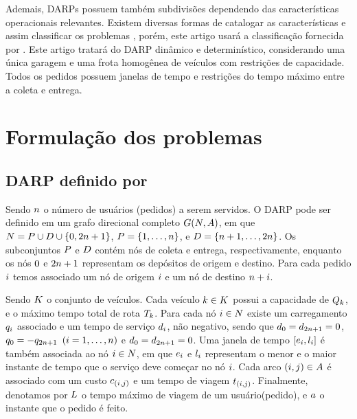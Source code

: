 \documentclass{anpet}
\begin{document}
Ademais, DARPs possuem também subdivisões dependendo das características operacionais relevantes. Existem diversas formas de catalogar as características e assim classificar os problemas \parencite{molenbruch_typology_2017, psaraftis_dynamic_2015, pillac_review_2013}, porém, este artigo usará a classificação fornecida por \textcite{ho_survey_2018}. Este artigo tratará do DARP dinâmico e determinístico, considerando uma única garagem e uma frota homogênea de veículos com restrições de capacidade. Todos os pedidos possuem janelas de tempo e restrições do tempo máximo entre a coleta e entrega.

\section{Formulação dos problemas}
\subsection{DARP definido por \textcite{cordeau_branch-and-cut_2006}}
Sendo $n$ o número de usuários (pedidos) a serem servidos. O DARP pode ser definido em um grafo direcional completo $G(N,A)$, em que $N = P \cup D \cup \{0, 2n{} + 1 \}$, $P = \{1, \ldots, n\}$, e $D = \{n + 1, \ldots, 2n\}$. Os subconjuntos $P$ e $D$ contém nós de coleta e entrega, respectivamente, enquanto os nós $0$ e $2n{} + 1$ representam os depósitos de origem e destino. Para cada pedido $i$ temos associado um nó de origem $i{}$ e um nó de destino ${n{} + i{}}$.

Sendo $K$ o conjunto de veículos. Cada veículo $k \in K$ possui a capacidade de $Q_{k}$, e o máximo tempo total de rota $T_k$. Para cada nó $i{} \in N$ existe um carregamento $q_i{}$ associado e um tempo de serviço $d_{i{}}$, não negativo, sendo que $d_{0} = d_{2n{} + 1} = 0$, $q_{0} = -q_{2n{} + 1}$ $(i = 1,\ldots,n)$ e $d_0 = d_{2n{} + 1} = 0$. Uma janela de tempo $[e_i{},l_i{}]$ é também associada ao nó $i{} \in N$, em que $e_i{}$ e $l_i{}$ representam o menor e o maior instante de tempo que o serviço deve começar no nó $i{}$. Cada arco $(i,j) \in A$ é associado com um custo $c_{(i,j)}$ e um tempo de viagem $t_{(i,j)}$. Finalmente, denotamos por $L$ o tempo máximo de viagem de um usuário(pedido), e $a$ o instante que o pedido é feito.
\end{document}
